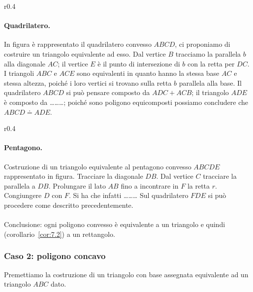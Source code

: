 \begin{wrapfigure}{r}{0.4\textwidth}
	\centering
\end{wrapfigure}
\paragraph{Quadrilatero.}
In figura è rappresentato il quadrilatero convesso $ABCD$, ci 
proponiamo di costruire un triangolo equivalente ad esso. Dal vertice 
$B$ tracciamo la parallela $b$ alla diagonale $AC$; il vertice $E$ è 
il punto di intersezione di $b$ con la retta per $DC$. I triangoli 
$ABC$ e $ACE$ sono equivalenti in quanto hanno la stessa base $AC$ e 
stessa altezza, poiché i loro vertici si trovano sulla retta $b$ 
parallela alla base. Il quadrilatero $ABCD$ si può pensare composto 
da $ADC + ACB$; il triangolo $ADE$ è composto da 
\ldots\ldots\ldots{}; poiché sono poligono equicomposti possiamo 
concludere che $ABCD\doteq ADE$.

\begin{wrapfigure}{r}{0.4\textwidth}
	\centering
\end{wrapfigure}
\paragraph{Pentagono.}
Costruzione di un triangolo equivalente al pentagono convesso $ABCDE$ 
rappresentato in figura.
Tracciare la diagonale $DB$.
Dal vertice $C$ tracciare la parallela a $DB$.
Prolungare il lato $AB$ fino a incontrare in $F$ la retta $r$.
Congiungere $D$ con $F$.
Si ha che  infatti \ldots\ldots\ldots{} 
Sul quadrilatero $FDE$ si può procedere come descritto 
precedentemente.

\paragraph*{}
Conclusione: ogni poligono convesso è equivalente a un triangolo e 
quindi (corollario~\ref{cor:7.2}) a un rettangolo.

\subsubsection{Caso 2: poligono concavo}

Premettiamo la costruzione di un triangolo con base assegnata 
equivalente ad un triangolo $ABC$ dato.

